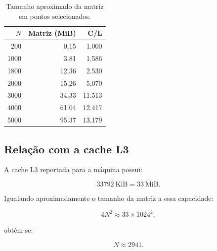 \begin{table}[H]
    \centering

    \caption{Tamanho aproximado da matriz em pontos selecionados.}
    \label{tab:atvd01-memoria}

    \begin{tabular}{rrr}
        \toprule
        \(N\)
        &
        \textbf{Matriz (MiB)}
        &
        \textbf{C/L}
        \\
        \midrule

        200
        & 0.15
        & 1.000
        \\

        1000
        & 3.81
        & 1.586
        \\

        1800
        & 12.36
        & 2.530
        \\

        2000
        & 15.26
        & 5.070
        \\

        3000
        & 34.33
        & 11.513
        \\

        4000
        & 61.04
        & 12.417
        \\

        5000
        & 95.37
        & 13.179
        \\

        \bottomrule
    \end{tabular}

\end{table}


\subsection{Relação com a cache L3}

A cache L3 reportada para a máquina possui:

\begin{equation}
    33792\ \mathrm{KiB}
    =
    33\ \mathrm{MiB}.
\end{equation}

Igualando aproximadamente o tamanho da matriz a essa capacidade:

\begin{equation}
    4N^2
    \approx
    33 \times 1024^2,
\end{equation}

obtém-se:

\begin{equation}
    N
    \approx
    2941.
\end{equation}

